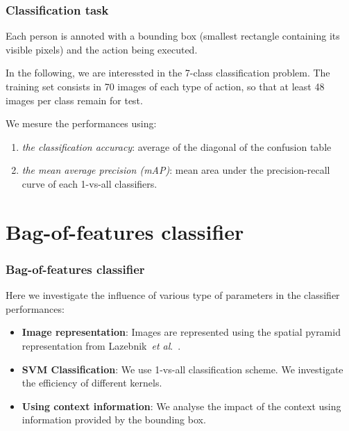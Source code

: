 \documentclass{beamer}
\def\etal{\emph{et al}.}
\begin{document}

\begin{frame}
\frametitle{Classification task}
Each person is annoted with a bounding box (smallest rectangle containing its visible pixels)
and the action being executed.

\vspace{0.3cm}
In the following, we are interessted in the 7-class classification problem.
The training set consists in 70 images of each type of action, so that at least 48 images
per class remain for test.

\vspace{0.3cm}
We mesure the performances using:
\begin{enumerate}[i]
\item {\em the classification accuracy}: average of the diagonal of the confusion table
\item {\em the mean average precision (mAP)}: mean area under the precision-recall curve of each 1-vs-all classifiers.
\end{enumerate}

\end{frame}


\section{Bag-of-features classifier}
\begin{frame}
\tableofcontents[currentsection]
\end{frame}


\begin{frame}
\frametitle{Bag-of-features classifier}
Here we investigate the influence of various type of parameters in the classifier
performances:

\begin{itemize}
\item \textbf{Image representation}: Images are represented using the spatial pyramid 
representation from Lazebnik~\etal~.
\item \textbf{SVM Classification}: We use 1-vs-all classification scheme. We investigate
the efficiency of different kernels.
\item \textbf{Using context information}: We analyse the impact of the context using
information provided by the bounding box.
\end{itemize}

\end{frame}
\end{document}
